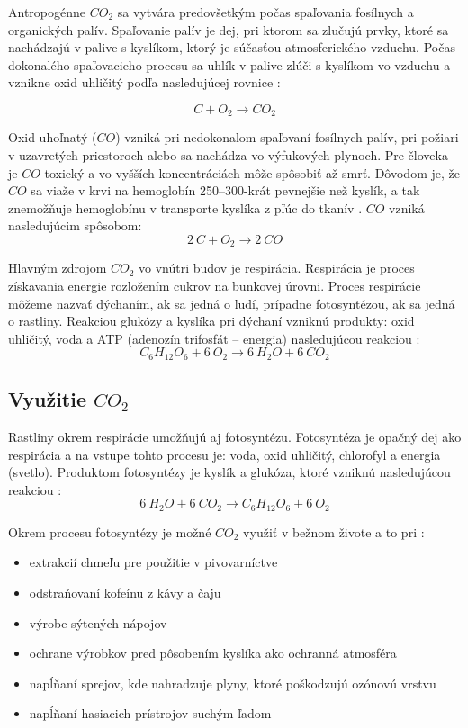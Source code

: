 Antropogénne $CO_2$ sa vytvára predovšetkým počas spaľovania fosílnych a organických palív. Spaľovanie palív je dej, pri ktorom sa zlučujú prvky, ktoré sa nachádzajú v palive s kyslíkom, ktorý je súčasťou atmosferického vzduchu. Počas dokonalého spaľovacieho procesu sa uhlík v palive zlúči s kyslíkom vo vzduchu a vznikne oxid uhličitý podľa nasledujúcej rovnice \cite{Hemoglobin}:

\begin{equation}
    C + O_2 \longrightarrow CO_2    
\end{equation}

Oxid uhoľnatý ($CO$) vzniká pri nedokonalom spaľovaní fosílnych palív, pri požiari v uzavretých priestoroch alebo sa nachádza vo výfukových plynoch. Pre človeka je $CO$ toxický a vo vyšších koncentráciách môže spôsobiť až smrť. Dôvodom je, že $CO$ sa viaže v krvi na hemoglobín 250--300-krát pevnejšie než kyslík, a tak znemožňuje hemoglobínu v transporte kyslíka z pľúc do tkanív \cite{Hemoglobin}. $CO$ vzniká nasledujúcim spôsobom:
\begin{equation}
    2\ C + O_2 \longrightarrow 2\ CO
\end{equation}

Hlavným zdrojom $CO_2$ vo vnútri budov je respirácia. Respirácia je proces získavania energie rozložením cukrov na bunkovej úrovni. Proces respirácie môžeme nazvať dýchaním, ak sa jedná o ľudí, prípadne fotosyntézou, ak sa jedná o rastliny. Reakciou glukózy a kyslíka pri dýchaní vzniknú produkty: oxid uhličitý, voda a ATP (adenozín trifosfát -- energia) nasledujúcou reakciou \cite{PhotosynthesisRespiracia}:
\begin{equation}
    C_6 H_{12} O_6 + 6\ O_2 \longrightarrow 6\ H_2O + 6\ CO_2
\end{equation}

\subsection{Využitie $CO_2$}
Rastliny okrem respirácie umožňujú aj fotosyntézu. Fotosyntéza je opačný dej ako respirácia a na vstupe tohto procesu je: voda, oxid uhličitý, chlorofyl a energia (svetlo). Produktom fotosyntézy je kyslík a glukóza, ktoré vzniknú nasledujúcou reakciou \cite{PhotosynthesisRespiracia}:
\begin{equation}
     6\ H_2O + 6\ CO_2 \longrightarrow C_6 H_{12} O_6 + 6\ O_2
\end{equation}

\noindent Okrem procesu fotosyntézy je možné $CO_2$ využiť v bežnom živote a to pri \cite{VyuzitieCO2}:
\begin{itemize}
    \item extrakcií chmeľu pre použitie v pivovarníctve
    \item odstraňovaní kofeínu z kávy a čaju
    \item výrobe sýtených nápojov
    \item ochrane výrobkov pred pôsobením kyslíka ako ochranná atmosféra
    \item napĺňaní sprejov, kde nahradzuje plyny, ktoré poškodzujú ozónovú vrstvu
    \item napĺňaní hasiacich prístrojov suchým ľadom
\end{itemize}

